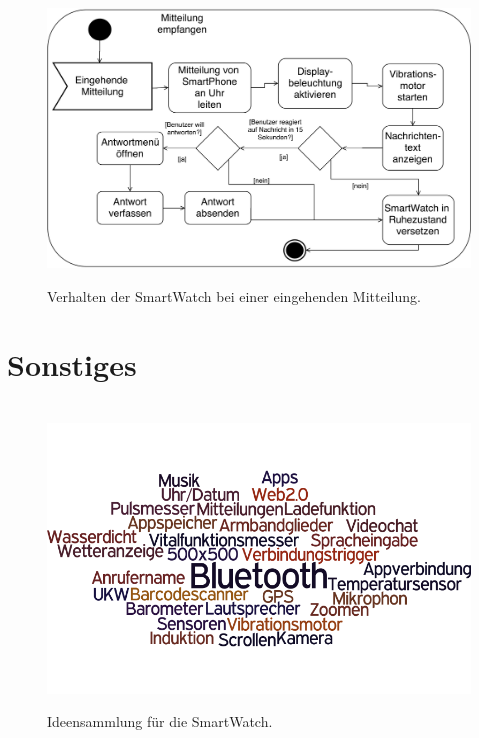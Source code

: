 \begin{appendices}
\begin{figure}[h]
\centering\
\includegraphics[width=\textwidth]{img/activityMitteilung}
\caption{Verhalten der SmartWatch bei einer eingehenden Mitteilung.}\label{fig:activityMitteilung}
\end{figure}

\section{Sonstiges}

\begin{figure}[h]
\centering\
\includegraphics[width=\textwidth]{img/tagcloud}
\caption{Ideensammlung für die SmartWatch.}\label{fig:tagcloud}
\end{figure}

\end{appendices}
